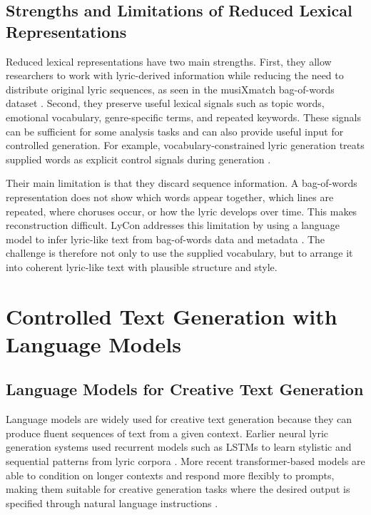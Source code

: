 \subsection{Strengths and Limitations of Reduced Lexical Representations}

Reduced lexical representations have two main strengths. First, they allow researchers to work with lyric-derived information while reducing the need to distribute original lyric sequences, as seen in the musiXmatch bag-of-words dataset \cite{musixmatch2011dataset}. Second, they preserve useful lexical signals such as topic words, emotional vocabulary, genre-specific terms, and repeated keywords. These signals can be sufficient for some analysis tasks and can also provide useful input for controlled generation. For example, vocabulary-constrained lyric generation treats supplied words as explicit control signals during generation \cite{ma2021ailyricist}.

Their main limitation is that they discard sequence information. A bag-of-words representation does not show which words appear together, which lines are repeated, where choruses occur, or how the lyric develops over time. This makes reconstruction difficult. LyCon addresses this limitation by using a language model to infer lyric-like text from bag-of-words data and metadata \cite{kim2024lycon}. The challenge is therefore not only to use the supplied vocabulary, but to arrange it into coherent lyric-like text with plausible structure and style.

\section{Controlled Text Generation with Language Models}

\subsection{Language Models for Creative Text Generation}

Language models are widely used for creative text generation because they can produce fluent sequences of text from a given context. Earlier neural lyric generation systems used recurrent models such as LSTMs to learn stylistic and sequential patterns from lyric corpora \cite{potash2015ghostwriter}. More recent transformer-based models are able to condition on longer contexts and respond more flexibly to prompts, making them suitable for creative generation tasks where the desired output is specified through natural language instructions \cite{vaswani2017attention}.

